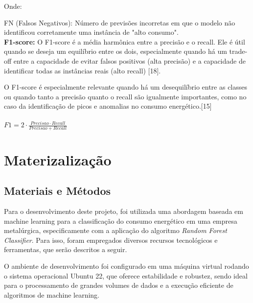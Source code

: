 \documentclass[conference]{IEEEtran}
\begin{document}
Onde: 
    
FN (Falsos Negativos): Número de previsões incorretas em que o modelo não identificou corretamente uma instância de "alto consumo". \\
    
\textbf{F1-score:} O F1-score é a média harmônica entre a precisão e o recall. Ele é útil quando se deseja um equilíbrio entre os dois, especialmente quando há um trade-off entre a capacidade de evitar falsos positivos (alta precisão) e a capacidade de identificar todas as instâncias reais (alto recall) [18]. 
    
O F1-score é especialmente relevante quando há um desequilíbrio entre as classes ou quando tanto a precisão quanto o recall são igualmente importantes, como no caso da identificação de picos e anomalias no consumo energético.[15] \\\\
    
    \begin{math} F1 = 2\cdot \frac{Precisao \cdot Recall}{Precisao + Recall}
    \end{math} \\


\section{Materizalização}
\subsection{Materiais e Métodos}

Para o desenvolvimento deste projeto, foi utilizada uma abordagem baseada em machine learning para a classificação do consumo energético em uma empresa metalúrgica, especificamente com a aplicação do algoritmo \textit{Random Forest Classifier}. Para isso, foram empregados diversos recursos tecnológicos e ferramentas, que serão descritos a seguir.  

O ambiente de desenvolvimento foi configurado em uma máquina virtual rodando o sistema operacional Ubuntu 22, que oferece estabilidade e robustez, sendo ideal para o processamento de grandes volumes de dados e a execução eficiente de algoritmos de machine learning. 
\end{document}
